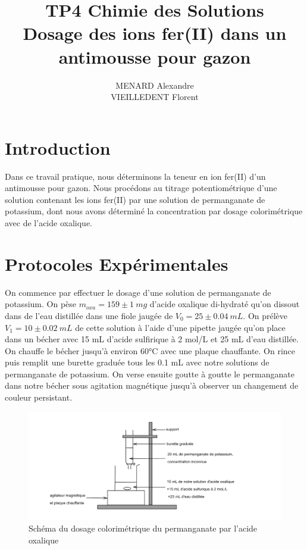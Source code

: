 \documentclass[12pt]{article}
\title{\textbf{TP4 Chimie des Solutions} \\ Dosage des ions fer(II) dans un antimousse pour gazon}
\author{MENARD Alexandre \\ VIEILLEDENT Florent}
\begin{document}
\maketitle

\section*{Introduction}
Dans ce travail pratique, nous déterminons la teneur en ion fer(II) d'un antimousse pour gazon. 
Nous procédons au titrage potentiométrique d'une solution contenant les ions fer(II) par une solution de permanganate de potassium, dont nous avons déterminé la concentration par dosage colorimétrique avec de l'acide oxalique.



\section{Protocoles Expérimentales}
On commence par effectuer le dosage d'une solution de permanganate de potassium. 
On pèse $m_{oxa}=159 \pm 1 \ mg$ d'acide oxalique di-hydraté qu'on dissout dans de l'eau distillée dans une fiole jaugée de $V_0=25\pm 0.04 \ mL$.
On prélève $V_{1}=10 \pm 0.02 \ mL$ de cette solution à l'aide d'une pipette jaugée qu'on place dans un bécher avec 15 mL d'acide sulfirique à 2 mol/L et 25 mL d'eau distillée.
On chauffe le bécher jusqu'à environ 60°C avec une plaque chauffante. 
On rince puis remplit une burette graduée tous les 0.1 mL avec notre solutions de permanganate de potassium.
On verse ensuite goutte à goutte le permanganate dans notre bécher sous agitation magnétique jusqu'à observer un changement de couleur persistant.
\begin{figure}[h!]
    \begin{center}
        \includegraphics[scale=0.12]{Img_dosage_permanganate.png}
        \caption{Schéma du dosage colorimétrique du permanganate par l'acide oxalique}
        \label{Img:dosage_colorimétrique}
    \end{center}
\end{figure}
\end{document}
